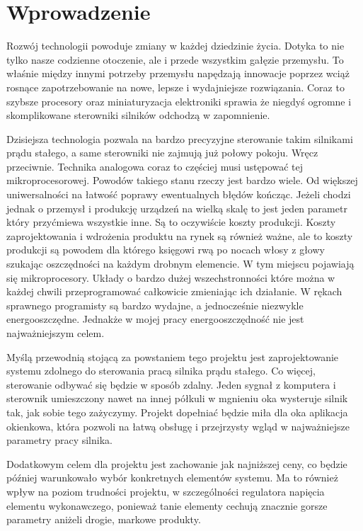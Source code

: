   \chapter{Wprowadzenie}
  
    Rozwój technologii powoduje zmiany w każdej dziedzinie życia. Dotyka to nie tylko nasze codzienne otoczenie, ale i przede wszystkim gałęzie przemysłu. To właśnie między innymi potrzeby przemysłu napędzają innowacje poprzez wciąż rosnące zapotrzebowanie na nowe, lepsze i wydajniejsze rozwiązania. Coraz to szybsze procesory oraz miniaturyzacja elektroniki sprawia że niegdyś ogromne i skomplikowane sterowniki silników odchodzą w zapomnienie. 
    
    Dzisiejsza technologia pozwala na bardzo precyzyjne sterowanie takim silnikami prądu stałego, a same sterowniki nie zajmują już połowy pokoju. Wręcz przeciwnie. Technika analogowa coraz to częściej musi ustępować tej mikroprocesorowej. Powodów takiego stanu rzeczy jest bardzo wiele. Od większej uniwersalności na łatwość poprawy ewentualnych błędów kończąc. Jeżeli chodzi jednak o przemysł i produkcję urządzeń na wielką skalę to jest jeden parametr który przyćmiewa wszystkie inne. Są to oczywiście koszty produkcji. Koszty zaprojektowania i wdrożenia produktu na rynek są również ważne, ale to koszty produkcji są powodem dla którego księgowi rwą po nocach włosy z głowy szukając oszczędności na każdym drobnym elemencie. W tym miejscu pojawiają się mikroprocesory. Układy o bardzo dużej wszechstronności które można w każdej chwili przeprogramować całkowicie zmieniając ich działanie. W rękach sprawnego programisty są bardzo wydajne, a jednocześnie niezwykle energooszczędne. Jednakże w mojej pracy energooszczędność nie jest najważniejszym celem. 
    
    Myślą przewodnią stojącą za powstaniem tego projektu jest zaprojektowanie systemu zdolnego do sterowania pracą silnika prądu stałego. Co więcej, sterowanie odbywać się będzie w sposób zdalny. Jeden sygnał z komputera i sterownik umieszczony nawet na innej półkuli w mgnieniu oka wysteruje silnik tak, jak sobie tego zażyczymy. Projekt dopełniać będzie miła dla oka aplikacja okienkowa, która pozwoli na łatwą obsługę i przejrzysty wgląd w najważniejsze parametry pracy silnika. 
    
    Dodatkowym celem dla projektu jest zachowanie jak najniższej ceny, co będzie później warunkowało wybór konkretnych elementów systemu. Ma to również wpływ na poziom trudności projektu, w szczególności regulatora napięcia elementu wykonawczego, ponieważ tanie elementy cechują znacznie gorsze parametry aniżeli drogie, markowe produkty.
    

